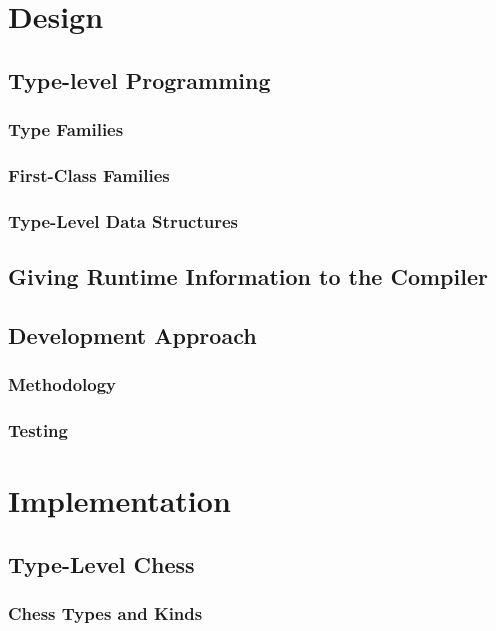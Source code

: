 \documentclass[12pt, a4paper, bibliography=totocnumbered]{scrreprt}
\begin{document}
\part{Design}

\chapter{Type-level Programming}

\section{Type Families}

\section{First-Class Families}

\section{Type-Level Data Structures}

\chapter{Giving Runtime Information to the Compiler}

\chapter{Development Approach}

\section{Methodology}

\section{Testing}


\part{Implementation}

\chapter{Type-Level Chess}

\section{Chess Types and Kinds}
\end{document}
